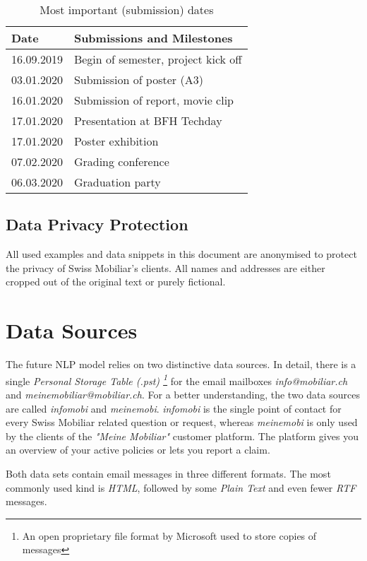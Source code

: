 \begin{table}[ht!]
    \centering
    \begin{tabular}{|l|l|}
        \hline
        \textbf{Date} & \textbf{Submissions and Milestones} \\ [0.5ex]
        \hline
        16.09.2019 & Begin of semester, project kick off \\
        03.01.2020 & Submission of poster (A3) \\
        16.01.2020 & Submission of report, movie clip \\
        17.01.2020 & Presentation at BFH Techday \\
        17.01.2020 & Poster exhibition \\
        07.02.2020 & Grading conference \\
        06.03.2020 & Graduation party \\ [1ex]
        \hline
    \end{tabular}
    \caption{Most important (submission) dates}
    \label{tbl:deadlines}
\end{table}

\subsection{Data Privacy Protection}

All used examples and data snippets in this document are anonymised to protect the privacy of Swiss Mobiliar's clients. All names
and addresses are either cropped out of the original text or purely fictional.

\section{Data Sources}
\label{chap:data-source}
The future NLP model relies on two distinctive data sources. In detail, there is a single \emph{Personal Storage Table (.pst)
\footnote{An open proprietary file format by Microsoft used to store copies of messages}} for the email mailboxes
\emph{info@mobiliar.ch} and \emph{meinemobiliar@mobiliar.ch}. For a better understanding, the two data sources are called
\emph{\gls{infomobi}} and \emph{\gls{meinemobi}}. \emph{infomobi} is the single point of contact for every Swiss Mobiliar
related question or request, whereas \emph{meinemobi} is only used by the clients of the \emph{"Meine Mobiliar"} customer platform.
The platform gives you an overview of your active policies or lets you report a claim.

Both data sets contain email messages in three different formats. The most commonly used kind is \emph{HTML}, followed by
some \emph{Plain Text} and even fewer \emph{RTF} messages.

